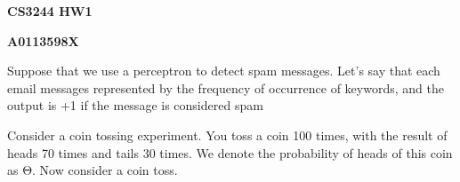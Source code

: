 \documentclass[10pt,a4paper,answers]{exam}
\providecommand{\nline}{\vspace*{.5cm}}
\begin{document}
\begin{center}
{\bf CS3244 HW1}

{\bf A0113598X}
\end{center}

\nline

\begin{questions}
	\question
	Suppose that we use a perceptron to detect spam messages. Let's say that each email messages represented by the frequency of occurrence of keywords, and the output is +1 if the message is considered spam

	\question
	Consider a coin tossing experiment. You toss a coin 100 times, with the result of heads 70 times and tails 30 times. We denote the probability of heads of this coin as Θ. Now consider a coin toss.
	\begin{parts}

\end{parts}
\end{questions}
\end{document}
